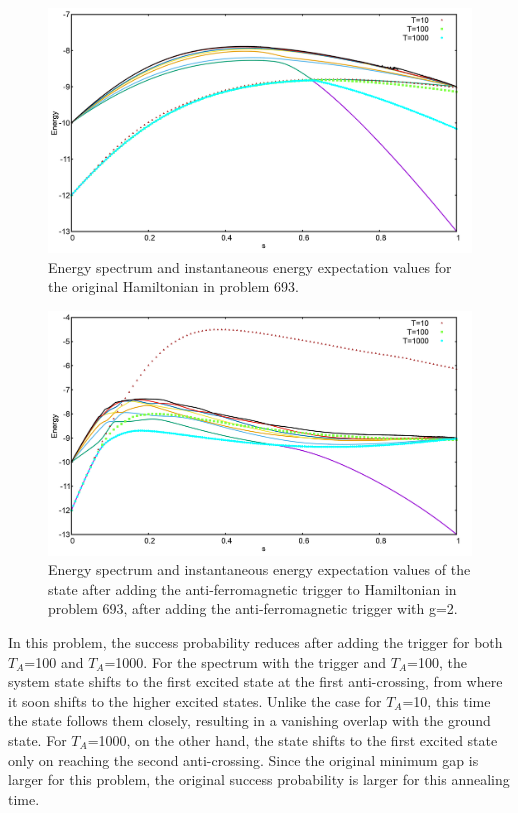 \documentclass[../main.tex]{subfiles}
\begin{document}
\begin{figure}[H]
\centering 
\includegraphics[scale=0.2]{693_O_g2.png}
\caption{Energy spectrum and instantaneous energy expectation values for the original Hamiltonian in problem 693.}
\label{fig:a42}
\end{figure}
\begin{figure}[H]
\centering 
\includegraphics[scale=0.2]{693_A_g2.png}
\caption{Energy spectrum and instantaneous energy expectation values of the state after adding the anti-ferromagnetic trigger to Hamiltonian in problem 693, after adding the anti-ferromagnetic trigger with g=2.}
\label{fig:a43}
\end{figure}

In this problem, the success probability reduces after adding the trigger for both $T_A$=100 and $T_A$=1000. For the spectrum with the trigger and $T_A$=100, the system state shifts to the first excited state at the first anti-crossing, from where it soon shifts to the higher excited states. Unlike the case for $T_A$=10, this time the state follows them closely, resulting in a vanishing overlap with the ground state. For $T_A$=1000, on the other hand, the state shifts to the first excited state only on reaching the second anti-crossing. Since the original minimum gap is larger for this problem, the original success probability is larger for this annealing time.
\end{document}
